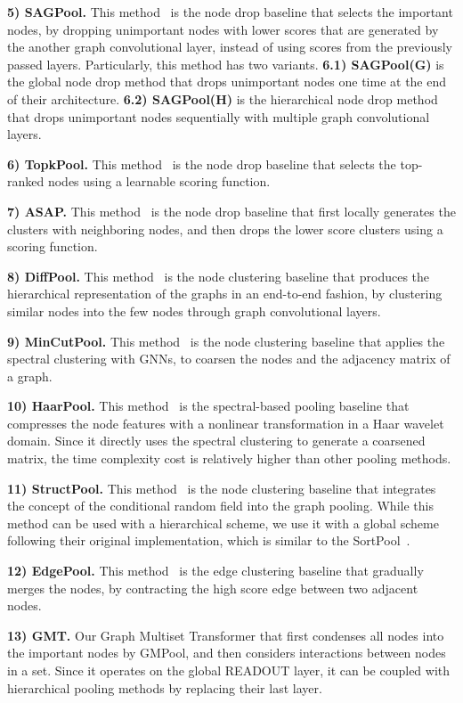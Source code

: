 \textbf{5) SAGPool.} This method~\citep{SAGPool} is the node drop baseline that selects the important nodes, by dropping unimportant nodes with lower scores that are generated by the another graph convolutional layer, instead of using scores from the previously passed layers. Particularly, this method has two variants. \textbf{6.1) SAGPool(G)} is the global node drop method that drops unimportant nodes one time at the end of their architecture. \textbf{6.2) SAGPool(H)} is the hierarchical node drop method that drops unimportant nodes sequentially with multiple graph convolutional layers.  

\textbf{6) TopkPool.} This method~\citep{TopKPool} is the node drop baseline that selects the top-ranked nodes using a learnable scoring function.

\textbf{7) ASAP.} This method~\citep{ASAP} is the node drop baseline that first locally generates the clusters with neighboring nodes, and then drops the lower score clusters using a scoring function.

\textbf{8) DiffPool.} This method~\citep{DiffPool} is the node clustering baseline that produces the hierarchical representation of the graphs in an end-to-end fashion, by clustering similar nodes into the few nodes through graph convolutional layers. 

\textbf{9) MinCutPool.} This method~\citep{MincutPool} is the node clustering baseline that applies the spectral clustering with GNNs, to coarsen the nodes and the adjacency matrix of a graph.

\textbf{10) HaarPool.} This method~\citep{HaarPool} is the spectral-based pooling baseline that compresses the node features with a nonlinear transformation in a Haar wavelet domain. Since it directly uses the spectral clustering to generate a coarsened matrix, the time complexity cost is relatively higher than other pooling methods.

\textbf{11) StructPool.} This method~\citep{StructPool} is the node clustering baseline that integrates the concept of the conditional random field into the graph pooling. While this method can be used with a hierarchical scheme, we use it with a global scheme following their original implementation, which is similar to the SortPool~\citep{SortPool}.

\textbf{12) EdgePool.} This method~\citep{edgepool} is the edge clustering baseline that gradually merges the nodes, by contracting the high score edge between two adjacent nodes. 

\textbf{13) GMT.} Our Graph Multiset Transformer that first condenses all nodes into the important nodes by GMPool, and then considers interactions between nodes in a set. Since it operates on the global READOUT layer, it can be coupled with hierarchical pooling methods by replacing their last layer.


